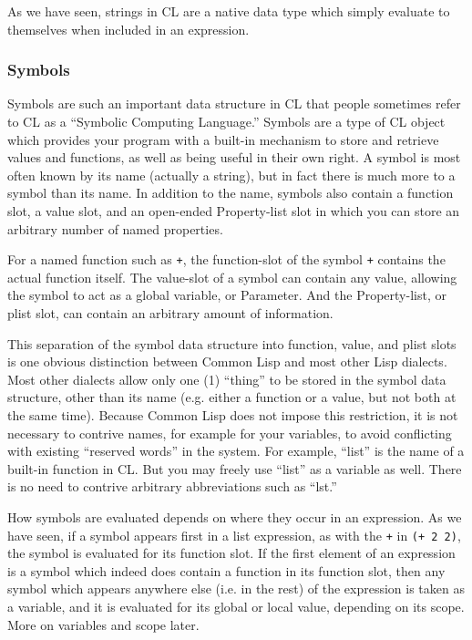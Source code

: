 As we have seen, strings in CL are a native data type which simply evaluate to themselves
when included in an expression.

\subsubsection{Symbols}

Symbols are such an important data structure in CL that people sometimes refer to CL
as a ``Symbolic Computing Language.'' Symbols are a type of CL object which provides
your program with a built-in mechanism to store and retrieve values and functions, as well
as being useful in their own right. A symbol is most often known by its name (actually a
string), but in fact there is much more to a symbol than its name. In addition to the name,
symbols also contain a function slot, a value slot, and an open-ended Property-list slot in
which you can store an arbitrary number of named properties.

For a named function such as \texttt{+}, the function-slot of the symbol \texttt{+} contains the actual
function itself. The value-slot of a symbol can contain any value, allowing the symbol to
act as a global variable, or Parameter. And the Property-list, or plist slot, can contain an
arbitrary amount of information.

This separation of the symbol data structure into function, value, and plist slots is one
obvious distinction between Common Lisp and most other Lisp dialects. Most other dialects
allow only one (1) ``thing'' to be stored in the symbol data structure, other than its name
(e.g. either a function or a value, but not both at the same time). Because Common Lisp
does not impose this restriction, it is not necessary to contrive names, for example for your
variables, to avoid conflicting with existing ``reserved words'' in the system. For example,
``list'' is the name of a built-in function in CL. But you may freely use ``list'' as a variable
as well. There is no need to contrive arbitrary abbreviations such as ``lst.''

How symbols are evaluated depends on where they occur in an expression. As we have
seen, if a symbol appears first in a list expression, as with the \texttt{+} in \texttt{(+ 2 2)}, the symbol is
evaluated for its function slot. If the first element of an expression is a symbol which indeed
does contain a function in its function slot, then any symbol which appears anywhere else
(i.e. in the rest) of the expression is taken as a variable, and it is evaluated for its global or
local value, depending on its scope. More on variables and scope later.

